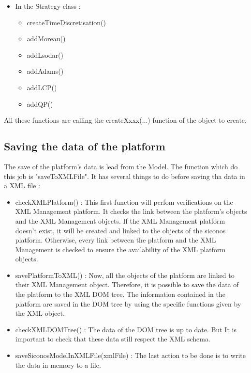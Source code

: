 \begin{itemize}
	\item In the Strategy class :
	\begin{itemize}
		\item createTimeDiscretisation()
		\item addMoreau()
		\item addLsodar()
		\item addAdams()
		\item addLCP()
		\item addQP()
	\end{itemize}
	
\end{itemize}
All these functions are calling the createXxxx(...) function of the object to create.

\subsection{Saving the data of the platform}
The save of the platform's data is lead from the Model. The function which do this job is
"saveToXMLFile". It has several things to do before saving tha data in a XML file :
\begin{itemize}
	\item checkXMLPlatform() : This first function will perfom verifications on the XML Management platform. It checks the
	link between the platform's objects and the XML Management objects. If the XML Management
	platform doesn't exist, it will be created and linked to the objects of the \ac{siconos}
	platform. Otherwise, every link between the platform and the XML Management is checked to ensure
	the availability of the XML platform objects.
	\item savePlatformToXML() : Now, all the objects of the platform are linked to their XML Management object. Therefore,
	it is possible to save the data of the platform to the XML DOM tree. The information
	contained in the platform are saved in the DOM tree by using the specific functions given
	by the XML object.
	\item checkXMLDOMTree() : The data of the DOM tree is up to date. But It is important to check that these data still
	respect the XML schema. 
	\item saveSiconosModelInXMLFile(xmlFile) : The last action to be done is to write the data in memory to a file.
\end{itemize}
